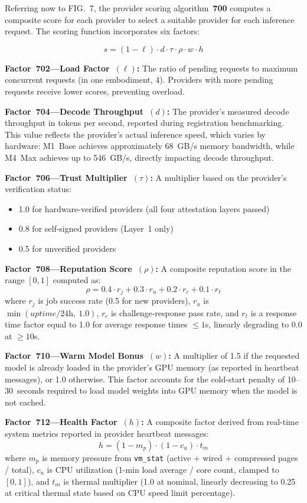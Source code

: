 \documentclass[11pt,letterpaper]{article}
\begin{document}
Referring now to FIG.~7, the provider scoring algorithm~\textbf{700} computes a composite score for each provider to select a suitable provider for each inference request. The scoring function incorporates six factors:

$$s = (1 - \ell) \cdot d \cdot \tau \cdot \rho \cdot w \cdot h$$

\textbf{Factor~702---Load Factor~$(\ell)$:} The ratio of pending requests to maximum concurrent requests (in one embodiment, 4). Providers with more pending requests receive lower scores, preventing overload.

\textbf{Factor~704---Decode Throughput~$(d)$:} The provider's measured decode throughput in tokens per second, reported during registration benchmarking. This value reflects the provider's actual inference speed, which varies by hardware: M1~Base achieves approximately 68~GB/s memory bandwidth, while M4~Max achieves up to 546~GB/s, directly impacting decode throughput.

\textbf{Factor~706---Trust Multiplier~$(\tau)$:} A multiplier based on the provider's verification status:
\begin{itemize}[nosep]
\item 1.0 for hardware-verified providers (all four attestation layers passed)
\item 0.8 for self-signed providers (Layer~1 only)
\item 0.5 for unverified providers
\end{itemize}

\textbf{Factor~708---Reputation Score~$(\rho)$:} A composite reputation score in the range $[0, 1]$ computed as:
$$\rho = 0.4 \cdot r_j + 0.3 \cdot r_u + 0.2 \cdot r_c + 0.1 \cdot r_t$$
where $r_j$ is job success rate (0.5 for new providers), $r_u$ is $\min(\mathit{uptime} / 24\mathrm{h},\ 1.0)$, $r_c$ is challenge-response pass rate, and $r_t$ is a response time factor equal to 1.0 for average response times $\leq 1$s, linearly degrading to 0.0 at $\geq 10$s.

\textbf{Factor~710---Warm Model Bonus~$(w)$:} A multiplier of 1.5 if the requested model is already loaded in the provider's GPU memory (as reported in heartbeat messages), or 1.0 otherwise. This factor accounts for the cold-start penalty of 10--30~seconds required to load model weights into GPU memory when the model is not cached.

\textbf{Factor~712---Health Factor~$(h)$:} A composite factor derived from real-time system metrics reported in provider heartbeat messages:
$$h = (1 - m_p) \cdot (1 - c_u) \cdot t_m$$
where $m_p$ is memory pressure from \texttt{vm\_stat} (active + wired + compressed pages / total), $c_u$ is CPU utilization (1-min load average / core count, clamped to $[0,1]$), and $t_m$ is thermal multiplier (1.0 at nominal, linearly decreasing to 0.25 at critical thermal state based on CPU speed limit percentage).
\end{document}
